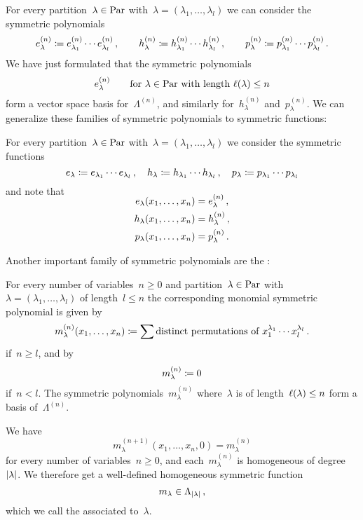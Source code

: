 \documentclass[a4paper,11pt]{scrartcl}
\begin{document}
For every partition~$\lambda \in \mathrm{Par}$ with~$\lambda = (\lambda_1, \dotsc, \lambda_l)$ we can consider the symmetric polynomials
\[
  e^{(n)}_\lambda
  \coloneqq
  e^{(n)}_{\lambda_1} \dotsm e^{(n)}_{\lambda_l} \,,
  \qquad
  h^{(n)}_\lambda
  \coloneqq
  h^{(n)}_{\lambda_1} \dotsm h^{(n)}_{\lambda_l} \,,
  \qquad
  p^{(n)}_\lambda
  \coloneqq
  p^{(n)}_{\lambda_1} \dotsm p^{(n)}_{\lambda_l} \,.
\]
We have just formulated that the symmetric polynomials
\[
  e^{(n)}_\lambda
  \qquad
  \text{for $\lambda \in \mathrm{Par}$ with length~$\ell(\lambda) \leq n$}
\]
form a vector space basis for~$\Lambda^{(n)}$, and similarly for~$h^{(n)}_\lambda$ and~$p^{(n)}_\lambda$.
We can generalize these families of symmetric polynomials to symmetric functions:

\begin{example}
  For every partition~$\lambda \in \mathrm{Par}$ with~$\lambda = (\lambda_1, \dotsc, \lambda_l)$ we consider the symmetric functions
  \[
    e_\lambda
    \coloneqq
    e_{\lambda_1} \dotsm e_{\lambda_l} \,,
    \quad
    h_\lambda
    \coloneqq
    h_{\lambda_1} \dotsm h_{\lambda_l} \,,
    \quad
    p_\lambda
    \coloneqq
    p_{\lambda_1} \dotsm p_{\lambda_l}
  \]
  and note that
  \begin{align*}
    \SwapAboveDisplaySkip
    e_\lambda(x_1, \dotsc, x_n)
    &=
    e^{(n)}_\lambda \,,
    \\
    h_\lambda(x_1, \dotsc, x_n)
    &=
    h^{(n)}_\lambda \,,
    \\
    p_\lambda(x_1, \dotsc, x_n)
    &=
    p^{(n)}_\lambda \,.
  \end{align*}
\end{example}

\begin{example}
  Another important family of symmetric polynomials are the :

  For every number of variables~$n \geq 0$ and partition~$\lambda \in \mathrm{Par}$ with~$\lambda = (\lambda_1, \dotsc, \lambda_l)$ of length~$l \leq n$ the corresponding monomial symmetric polynomial is given by
  \[
    m^{(n)}_\lambda(x_1, \dotsc, x_n)
    \coloneqq
    \sum \text{distinct permutations of~$x_1^{\lambda_1} \dotsm x_l^{\lambda_l}$} \,.
  \]
  if~$n \geq l$, and by
  \[
    m^{(n)}_\lambda
    \coloneqq
    0
  \]
  if~$n < l$.
  The symmetric polynomials~$m^{(n)}_\lambda$ where~$\lambda$ is of length~$\ell(\lambda) \leq n$ form a basis of~$\Lambda^{(n)}$.

  We have
  \[
    m^{(n+1)}_\lambda(x_1, \dotsc, x_n, 0)
    =
    m^{(n)}_\lambda
  \]
  for every number of variables~$n \geq 0$, and each~$m_\lambda^{(n)}$ is homogeneous of degree~$\lvert\lambda\rvert$.
  We therefore get a well-defined homogeneous symmetric function
  \[
    m_\lambda
    \in
    \Lambda_{\lvert\lambda\rvert} \,,
  \]
  which we call the  associated to~$\lambda$.
\end{example}
\end{document}
